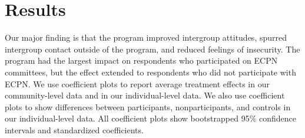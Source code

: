 \documentclass[11pt]{article}
\begin{document}
\hypertarget{results}{%
\section{Results}\label{results}}

Our major finding is that the program improved intergroup attitudes,
spurred intergroup contact outside of the program, and reduced feelings
of insecurity. The program had the largest impact on respondents who
participated on ECPN committees, but the effect extended to respondents
who did not participate with ECPN. We use coefficient plots to report
average treatment effects in our community-level data and in our
individual-level data. We also use coefficient plots to show differences
between participants, nonparticipants, and controls in our
individual-level data. All coefficient plots show bootstrapped 95\%
confidence intervals and standardized coefficients.
\end{document}
